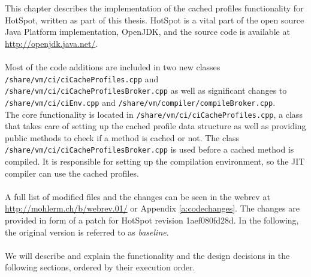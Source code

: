 This chapter describes the implementation of the cached profiles functionality for HotSpot, written as part of this thesis.
HotSpot is a vital part of the open source Java Platform implementation, OpenJDK, and the source code is available at \url{http://openjdk.java.net/}.
\\\\
Most of the code additions are included in two new classes \texttt{/share/vm/ci/ciCacheProfiles.cpp} and \texttt{/share/vm/ci/ciCacheProfilesBroker.cpp} as well as significant changes to \\\texttt{/share/vm/ci/ciEnv.cpp} and \texttt{/share/vm/compiler/compileBroker.cpp}.
\\
The core functionality is located in \texttt{/share/vm/ci/ciCacheProfiles.cpp}, a class that takes care of setting up the cached profile data structure as well as providing public methods to check if a method is cached or not. The class \texttt{/share/vm/ci/ciCacheProfilesBroker.cpp} is used before a cached method is compiled. It is responsible for setting up the compilation environment, so the JIT compiler can use the cached profiles.
\\\\
A full list of modified files and the changes can be seen in the webrev at \url{http://mohlerm.ch/b/webrev.01/} or Appendix \ref{a:codechanges}.
The changes are provided in form of a patch for HotSpot revision 1aef080fd28d. In the following, the original version is referred to as \textit{baseline}.
\\\\
We will describe and explain the functionality and the design decisions in the following sections, ordered by their execution order.

